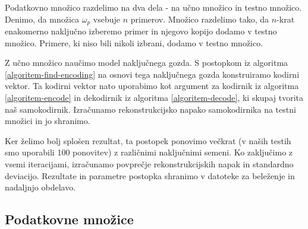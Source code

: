 \documentclass[12pt,a4paper,twoside]{article}
\theoremstyle{definition} %
\theoremstyle{plain} %
\numberwithin{equation}{section}  %
\begin{document}


Podatkovno množico razdelimo na dva dela - na učno množico in testno množico.
Denimo, da množica $\omega_p$ vsebuje $n$ primerov.
Množico razdelimo tako, da $n$-krat enakomerno naključno izberemo primer in njegovo kopijo dodamo v testno množico.
Primere, ki niso bili nikoli izbrani, dodamo v testno množico.

Z učno množico naučimo model naključnega gozda. %
S postopkom iz algoritma \ref{algoritem-find-encoding} na osnovi tega naključnega gozda konstruiramo kodirni vektor.
Ta kodirni vektor nato uporabimo kot argument za kodirnik iz algoritma \ref{algoritem-encode} in dekodirnik iz algoritma \ref{algoritem-decode}, ki skupaj tvorita naš samokodirnik.
Izračunamo rekonstrukcijsko napako samokodirnika na testni množici in jo shranimo.

Ker želimo bolj splošen rezultat, ta postopek ponovimo večkrat (v naših testih smo uporabili 100 ponovitev) z različnimi naključnimi semeni.
Ko zaključimo z vsemi iteracijami, izračunamo povprečje rekonstrukcijskih napak in standardno deviacijo.
Rezultate in parametre postopka shranimo v datoteke za beleženje in nadaljnjo obdelavo.



\subsection{Podatkovne množice}
\label{pogl:podatkovne_mnozice}
\end{document}
